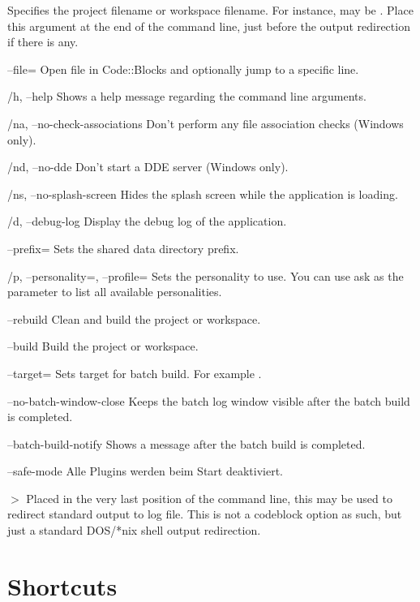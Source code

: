 \begin{optentry}
\item[\var{filename}] Specifies the project  filename or workspace  filename. For instance,  may be . Place this argument at the end of the command line, just before the output redirection if there is any.
\item[--file=\var{filename}\optional{:line}] Open file in Code::Blocks and optionally jump to a specific line.
\item[/h, --help] Shows a help message regarding the command line arguments.
\item[/na, --no-check-associations] Don't perform any file association checks (Windows only).
\item[/nd, --no-dde] Don't start a DDE server (Windows only).
\item[/ns, --no-splash-screen] Hides the splash screen while the application is loading.
\item[/d, --debug-log] Display the debug log of the application.
\item[--prefix=\var{str}] Sets the shared data directory prefix.
\item[/p, --personality=\var{str}, --profile=\var{str}] Sets the personality to use. You can use ask as the parameter to list all available personalities.
\item[--rebuild] Clean and build the project or workspace.
\item[--build] Build the project or workspace.
\item[--target=\var{str}] Sets target for batch build. For example .
\item[--no-batch-window-close] Keeps the batch log window visible after the batch build is completed.
\item[--batch-build-notify] Shows a message after the batch build is completed.
\item[--safe-mode] Alle Plugins werden beim Start deaktiviert.
\item[$>$ \var{build log file}] Placed in the very last position of the command line, this may be used to redirect standard output to log file. This is not a codeblock option as such, but just a standard DOS/*nix shell output redirection.
\end{optentry}

\section{Shortcuts}

